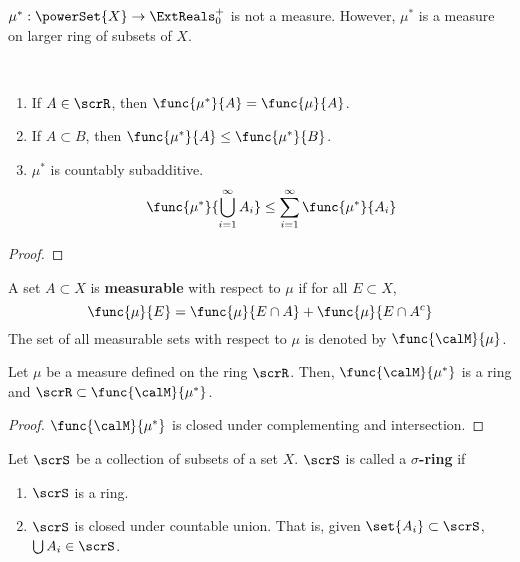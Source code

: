 \begin{remark}
    \(\mu^{\ast}: \powerSet{X} \to \ExtReals^+_0\) is not a measure. However, \(\mu^{\ast}\) is a measure on larger ring of subsets of \(X\).
\end{remark}

\begin{proposition}
    \ 
    \begin{enumerate}
        \item If \(A \in \scrR\), then \(\func{\mu^{\ast}}{A} = \func{\mu}{A}\).
        \item If \(A \subset B\), then \(\func{\mu^{\ast}}{A} \leq \func{\mu^{\ast}}{B}\).
        \item \(\mu^{\ast}\) is countably subadditive. 
        \begin{equation*}
            \func{\mu^{\ast}}{\bigcup_{i=1}^{\infty} A_i}  \leq \sum_{i = 1}^{\infty} \func{\mu^{\ast}}{A_i}
        \end{equation*}
    \end{enumerate}
\end{proposition}

\begin{proof}
    
\end{proof}

\begin{definition}
    A set \(A \subset X\) is \textbf{measurable} with respect to \(\mu\) if for all \(E \subset X\),
    \begin{equation*}
        \func{\mu}{E} = \func{\mu}{E \cap A} + \func{\mu}{E \cap A^c}
    \end{equation*}
    The set of all measurable sets with respect to \(\mu\) is denoted by \(\func{\calM}{\mu}\).
\end{definition}

\begin{proposition}
    Let \(\mu\) be a measure defined on the ring \(\scrR\). Then, \(\func{\calM}{\mu^{\ast}}\) is a ring and \(\scrR \subset \func{\calM}{\mu^{\ast}}\).
\end{proposition}

\begin{proof}
         \(\func{\calM}{\mu^{\ast}}\) is closed under complementing and intersection.
\end{proof}


\begin{definition}
    Let \(\scrS\) be a collection of subsets of a set \(X\). \(\scrS\) is called a \textbf{\(\sigma\)-ring} if
    \begin{enumerate}
        \item \(\scrS\) is a ring.
        \item \(\scrS\) is closed under countable union. That is, given \(\set{A_i} \subset \scrS\), \(\bigcup A_i \in \scrS\).
    \end{enumerate} 
\end{definition}

